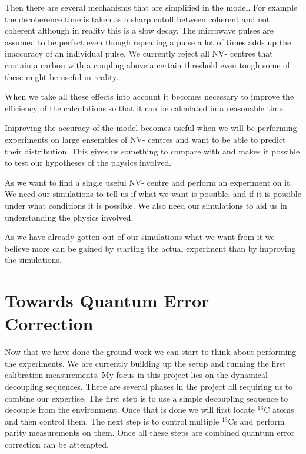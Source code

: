 Then there are several mechanisms that are simplified in the model. For example the decoherence time is taken as a sharp cutoff between coherent and not coherent although in reality this is a slow decay. The microwave pulses are assumed to be perfect even though repeating a pulse a lot of times adds up the inaccuracy of an individual pulse. We currently reject all NV- centres that contain a carbon with a coupling above a certain threshold even tough some of these might be useful in reality. 

When we take all these effects into account it becomes necessary to improve the efficiency of the calculations so that it can be calculated in a reasonable time. 

Improving the accuracy of the model becomes useful when we will be performing experiments on large ensembles of NV- centres and want to be able to predict their distribution. This gives us something to compare with and makes it possible to test our hypotheses of the physics involved. 

As we want to find a single useful NV- centre and perform an experiment on it. We need our simulations to tell us if what we want is possible, and if it is possible under what conditions it is possible. We also need our simulations to aid us in understanding the physics involved. 

As we have already gotten out of our simulations what we want from it we believe more can be gained by starting the actual experiment than by improving the simulations. 

\chapter{Towards Quantum Error Correction}
\label{towardsquantumerrorcorrection}

Now that we have done the ground-work we can start to think about performing the experiments. We are currently building up the setup and running the first calibration measurements. My focus in this project lies on the dynamical decoupling sequences. There are several phases in the project all requiring us to combine our expertise. The first step is to use a simple decoupling sequence to decouple from the environment. Once that is done we will first locate $^{13}\mathrm{C}$ atoms and then control them. The next step is to control multiple $^{13}\mathrm{C}$s and perform parity measurements on them. Once all these steps are combined quantum error correction can be attempted. 

